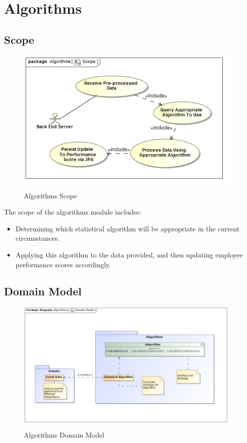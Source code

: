 \documentclass[11pt,a4paper]{article}
\begin{document}
\pagebreak

\section{Algorithms}
\subsection{Scope}
\begin{figure}[H]
	\begin{center}
		\includegraphics[scale=0.75]{../Images/Algorithms_Scope.jpg}
		\caption{Algorithms Scope}
	\end{center}
\end{figure}
The scope of the algorithms module includes:
\begin{itemize}
	\item Determining which statistical algorithm will be appropriate in the current circumstances.
	\item Applying this algorithm to the data provided, and then updating employee performance scores accordingly.
\end{itemize}

\subsection{Domain Model}
\begin{figure}[H]
	\begin{center}
		\includegraphics[scale=0.5]{../Images/Algorithms_Domain_Model.jpg}
		\caption{Algorithms Domain Model}
	\end{center}
\end{figure}
\end{document}
